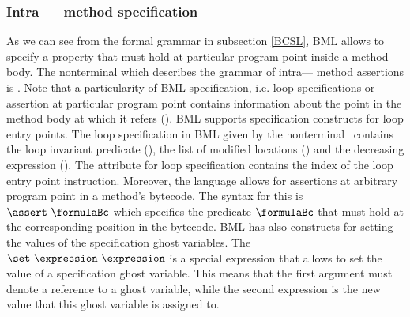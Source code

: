 





\subsubsection{Intra --- method specification}
As we can see from the formal  grammar in subsection \ref{BCSL}, BML allows to specify a property that must hold at 
particular program point inside a method body. The nonterminal which describes the grammar of intra--- method assertions is
 \intraMethodSpec.
 Note that a particularity of BML specification, i.e. loop specifications or assertion at particular program point
 contains information about the point in the method body at which it refers (\atIndex).
BML supports specification constructs for loop entry points. The loop specification in BML given by the nonterminal \loopSpec \ 
contains the loop invariant predicate  (\loopInv), the list of modified locations (\loopMod) and
 the decreasing expression (\loopDecreases). The \atIndex{} attribute for loop specification contains the index of the loop entry point instruction.
Moreover, the language allows for assertions at arbitrary program point in a method's bytecode. The syntax for this is $\assert \ \formulaBc $
 which specifies the predicate $\formulaBc $ that must hold at the corresponding position in the bytecode.
BML has also constructs for setting the values of the specification ghost variables.  
The  $ \set \ \expression \  \expression $ is a special expression that allows to set the value of a specification ghost variable. This means
 that the first argument must denote a reference to a ghost variable, while the second expression is the new value that this 
ghost variable is assigned to. 

